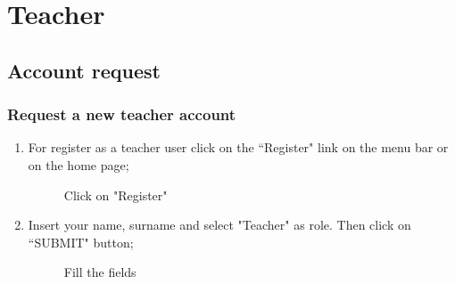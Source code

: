 \documentclass[ManualeUtente]{subfiles}
\begin{document}
\chapter{Teacher}
\section{Account request}
\subsection{Request a new teacher account}
\begin{enumerate}
	\item For register as a teacher user click on the \textquotedblleft Register" link on the menu bar or on the home page;
	\begin{figure}[H]
		\centering
		\caption{Click on "Register"}
		\label{fig:Click on "Register"}
	\end{figure} \newpage
	\item Insert your name, surname and select "Teacher" as role. Then click on \textquotedblleft SUBMIT" button;
	\begin{figure}[H]
		\centering
		\caption{Fill the fields}
		\label{fig:Fill the fields}
	\end{figure}
	
\end{enumerate}
\newpage
\end{document}
